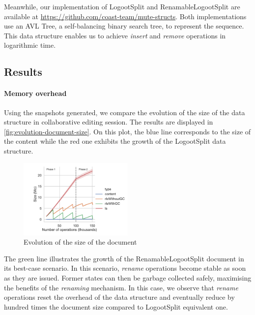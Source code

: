 \documentclass[sigplan,10pt]{acmart}
\begin{document}
\begin{sloppypar}
Meanwhile, our implementation of LogootSplit and RenamableLogootSplit are available at \url{https://github.com/coast-team/mute-structs}.
Both implementations use an AVL Tree, a self-balancing binary search tree, to represent the sequence.
This data structure enables us to achieve \emph{insert} and \emph{remove} operations in logarithmic time.
\end{sloppypar}

\subsection{Results}

\paragraph{Memory overhead}

Using the snapshots generated, we compare the evolution of the size of the data structure in collaborative editing session.
The results are displayed in \autoref{fig:evolution-document-size}.
On this plot, the blue line corresponds to the size of the content while the red one exhibits the growth of the LogootSplit data structure.

\begin{figure}
    \centering
    \includegraphics[width=0.5\textwidth]{img/snapshots-sizes.pdf}
    \caption{Evolution of the size of the document}
    \label{fig:evolution-document-size}
\end{figure}

The green line illustrates the growth of the RenamableLogootSplit document in its best-case scenario.
In this scenario, \emph{rename} operations become stable as soon as they are issued.
Former states can then be garbage collected safely, maximising the benefits of the \emph{renaming} mechanism.
In this case, we observe that \emph{rename} operations reset the overhead of the data structure and eventually reduce by hundred times the document size compared to LogootSplit equivalent one.
\end{document}
